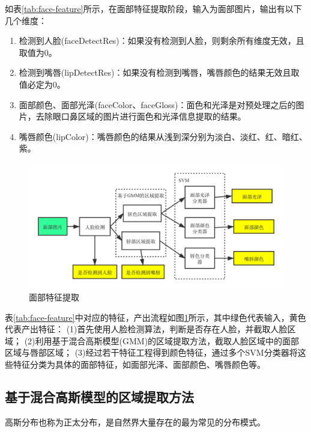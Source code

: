 如表\ref{tab:face-feature}所示，在面部特征提取阶段，输入为面部图片，输出有以下几个维度：
 \begin{enumerate}
     \item 检测到人脸(faceDetectRes)：如果没有检测到人脸，则剩余所有维度无效，且取值为0。

     \item 检测到嘴唇(lipDetectRes)：如果没有检测到嘴唇，嘴唇颜色的结果无效且取值必定为0。

     \item 面部颜色、面部光泽(faceColor、faceGloss)：面色和光泽是对预处理之后的图片，去除眼口鼻区域的图片进行面色和光泽信息提取的结果。

     \item 嘴唇颜色(lipColor)：嘴唇颜色的结果从浅到深分别为淡白、淡红、红、暗红、紫。
\end{enumerate}

\begin{figure}[htb]
    \centering
    \includegraphics[width=15cm]{images/face_feature.png}
    \caption{面部特征提取}
    \label{fig:face_feature}
\end{figure}

表\ref{tab:face-feature}中对应的特征，产出流程如图\ref{fig:face_feature}所示，其中绿色代表输入，黄色代表产出特征：
(1)首先使用人脸检测算法，判断是否存在人脸，并截取人脸区域；
(2)利用基于混合高斯模型(GMM)的区域提取方法\cite{Hu2016Robust}，截取人脸区域中的面部区域与唇部区域；
(3)经过若干特征工程得到颜色特征，通过多个SVM分类器将这些特征分类为具体的面部特征，如面部光泽、面部颜色、嘴唇颜色等。


\subsection{基于混合高斯模型的区域提取方法}

高斯分布也称为正太分布，是自然界大量存在的最为常见的分布模式。

